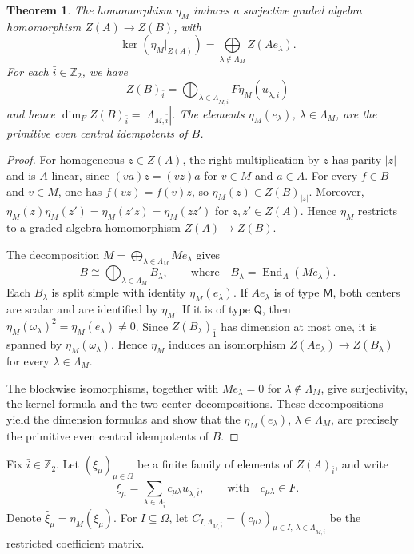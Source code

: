 \documentclass[11pt]{amsart}
\numberwithin{equation}{section}
\theoremstyle{plain}
\newtheorem{thm}{Theorem}[section]
\theoremstyle{definition}
\theoremstyle{remark}
\DeclareMathOperator{\End}{End}
\begin{document}
\begin{thm}\label{prop:supp-center}
The homomorphism $\eta_M$ induces a surjective graded algebra homomorphism $Z(A)\to Z(B)$, with 
$$
\ker(\eta_M|_{Z(A)})=\bigoplus\limits_{\lambda\notin\Lambda_M}Z(Ae_\lambda).
$$
For each $\bar i\in\mathbb Z_2$, we have
$$
Z(B)_{\bar i}=\bigoplus_{\lambda\in\Lambda_{M,\bar i}}F\eta_M(u_{\lambda,\bar i})
$$
and hence $\dim_F Z(B)_{\bar i}=|\Lambda_{M,\bar i}|$.
The elements $\eta_M(e_\lambda)$, $\lambda\in\Lambda_M$,
are the primitive even central idempotents of $B$.
\end{thm}

\begin{proof}
For homogeneous $z\in Z(A)$, the right multiplication by $z$ has parity
$|z|$ and is $A$-linear, since $(va)z=(vz)a$ for $v\in M$ and
$a\in A$. For every $f\in B$ and $v\in M$, one has
$f(vz)=f(v)z$, so $\eta_M(z)\in Z(B)_{|z|}$.
Moreover,
$\eta_M(z)\eta_M(z')=\eta_M(z'z)=\eta_M(zz')$
for $z,z'\in Z(A)$. Hence $\eta_M$ restricts to a graded algebra
homomorphism $Z(A)\to Z(B)$.

The decomposition
$M=\bigoplus_{\lambda\in\Lambda_M}Me_\lambda$ gives
$$
B\cong
\bigoplus_{\lambda\in\Lambda_M}
B_\lambda,\qquad \text{where} \quad B_\lambda=\End_A(Me_\lambda).
$$
Each $B_\lambda$ is split simple with identity $\eta_M(e_\lambda)$. If $Ae_\lambda$ is of type $\mathsf{M}$, both centers are scalar and are identified by $\eta_M$. If it is of type $\mathsf{Q}$,  then $\eta_M(\omega_\lambda)^2=\eta_M(e_\lambda)\ne0$. Since $Z(B_\lambda)_{\bar 1} $ has dimension at most one, it is spanned by $\eta_{M}(\omega_\lambda)$. Hence $\eta_M$ induces an isomorphism $Z(Ae_\lambda)\to Z(B_\lambda)$ for every $\lambda\in \Lambda_M$.

The blockwise isomorphisms, together with $Me_\lambda=0$ for $\lambda\notin\Lambda_M$, give surjectivity, the kernel formula and the two center decompositions. These decompositions yield the dimension formulas and show that the $\eta_M(e_\lambda)$, $\lambda\in\Lambda_M$, are precisely the primitive even central idempotents of $B$.
\end{proof}

Fix $\bar i\in\mathbb Z_2$.
Let $(\xi_\mu)_{\mu\in\Omega}$ be a finite family of
elements of $Z(A)_{\bar i}$, and write
\begin{equation}\label{eq:center-expand}
\xi_\mu
=
\sum_{\lambda\in\Lambda_{\bar i}}
c_{\mu\lambda}u_{\lambda,\bar i},
\qquad \text{with}\quad c_{\mu\lambda}\in F.
\end{equation}
Denote $\widehat{\xi}_\mu=\eta_M(\xi_\mu)$.
For $I\subseteq\Omega$, let
$C_{I,\Lambda_{M,\bar i}}
=(c_{\mu\lambda})_{\mu\in I,\ \lambda\in\Lambda_{M,\bar i}}$
be the restricted coefficient matrix.
\end{document}
